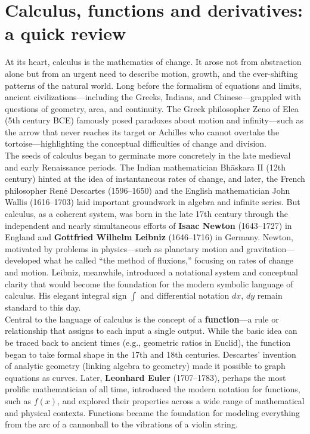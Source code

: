\documentclass{book}
\begin{document}
\chapter{Calculus, functions and derivatives: a quick review}

At its heart, calculus is the mathematics of change. It arose not from abstraction alone but from an urgent need to describe motion, growth, and the ever-shifting patterns of the natural world. Long before the formalism of equations and limits, ancient civilizations---including the Greeks, Indians, and Chinese---grappled with questions of geometry, area, and continuity. The Greek philosopher Zeno of Elea (5th century BCE) famously posed paradoxes about motion and infinity---such as the arrow that never reaches its target or Achilles who cannot overtake the tortoise---highlighting the conceptual difficulties of change and division.\\

The seeds of calculus began to germinate more concretely in the late medieval and early Renaissance periods. The Indian mathematician Bhāskara II (12th century) hinted at the idea of instantaneous rates of change, and later, the French philosopher René Descartes (1596--1650) and the English mathematician John Wallis (1616--1703) laid important groundwork in algebra and infinite series. But calculus, as a coherent system, was born in the late 17th century through the independent and nearly simultaneous efforts of \textbf{Isaac Newton} (1643--1727) in England and \textbf{Gottfried Wilhelm Leibniz} (1646--1716) in Germany. Newton, motivated by problems in physics---such as planetary motion and gravitation---developed what he called ``the method of fluxions,'' focusing on rates of change and motion. Leibniz, meanwhile, introduced a notational system and conceptual clarity that would become the foundation for the modern symbolic language of calculus. His elegant integral sign $\int$ and differential notation $dx$, $dy$ remain standard to this day.\\

Central to the language of calculus is the concept of a \textbf{function}---a rule or relationship that assigns to each input a single output. While the basic idea can be traced back to ancient times (e.g., geometric ratios in Euclid), the function began to take formal shape in the 17th and 18th centuries. Descartes’ invention of analytic geometry (linking algebra to geometry) made it possible to graph equations as curves. Later, \textbf{Leonhard Euler} (1707--1783), perhaps the most prolific mathematician of all time, introduced the modern notation for functions, such as $f(x)$, and explored their properties across a wide range of mathematical and physical contexts. Functions became the foundation for modeling everything from the arc of a cannonball to the vibrations of a violin string.\\
\end{document}
